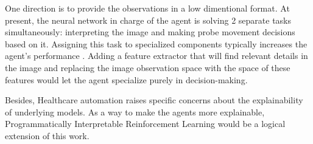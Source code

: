 One direction is to provide the observations in a low dimentional format.
At present, the neural network in charge of the agent is solving 2 separate tasks simultaneously: interpreting the image and making probe movement decisions based on it. Assigning this task to specialized components typically increases the agent's performance \cite{decoupling-rl}. Adding a feature extractor that will find relevant details in the image and replacing the image observation space with the space of these features would let the agent specialize purely in decision-making.

Besides, Healthcare automation raises specific concerns \cite{health-ai-explainability1,health-ai-explainability2} about the explainability of underlying models. 
As a way to make the agents more explainable, Programmatically Interpretable Reinforcement Learning \cite{pirl,neurogenetic} would be a logical extension of this work.
